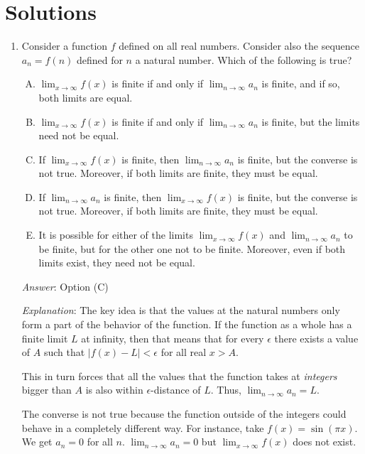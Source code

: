 \documentclass[10pt]{amsart}
\begin{document}
\section{Solutions}
\begin{enumerate}

\item Consider a function $f$ defined on all real numbers. Consider
  also the sequence $a_n = f(n)$ defined for $n$ a natural
  number. Which of the following is true?

  \begin{enumerate}[(A)]
  \item $\lim_{x \to \infty} f(x)$ is finite if and only if $\lim_{n
    \to \infty} a_n$ is finite, and if so, both limits are equal.
  \item $\lim_{x \to \infty} f(x)$ is finite if and only if $\lim_{n
    \to \infty} a_n$ is finite, but the limits need not be equal.
  \item If $\lim_{x \to \infty} f(x)$ is finite, then $\lim_{n \to
    \infty} a_n$ is finite, but the converse is not true. Moreover, if
    both limits are finite, they must be equal.
  \item If $\lim_{n \to \infty} a_n$ is finite, then $\lim_{x \to
    \infty} f(x)$ is finite, but the converse is not true. Moreover, if
    both limits are finite, they must be equal.
  \item It is possible for either of the limits $\lim_{x \to \infty}
    f(x)$ and $\lim_{n \to \infty} a_n$ to be finite, but for the
    other one not to be finite. Moreover, even if both limits exist,
    they need not be equal.
  \end{enumerate}

  {\em Answer}: Option (C)

  {\em Explanation}: The key idea is that the values at the natural
  numbers only form a part of the behavior of the function. If the
  function as a whole has a finite limit $L$ at infinity, then that
  means that for every $\epsilon$ there exists a value of $A$ such
  that $|f(x) - L| < \epsilon$ for all real $x > A$.

  This in turn forces that all the values that the function takes at
  {\em integers} bigger than $A$ is also within $\epsilon$-distance of
  $L$. Thus, $\lim_{n \to \infty} a_n = L$.

  The converse is not true because the function outside of the
  integers could behave in a completely different way. For instance,
  take $f(x) =\sin(\pi x)$. We get $a_n = 0$ for all $n$. $\lim_{n \to
  \infty} a_n = 0$ but $\lim_{x \to \infty} f(x)$ does not exist.


\end{enumerate}
\end{document}
